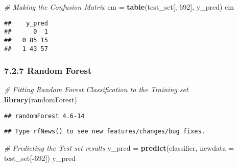 \documentclass[]{article}
\newenvironment{Shaded}{\begin{snugshade}}{\end{snugshade}}
\newcommand{\CommentTok}[1]{\textcolor[rgb]{0.56,0.35,0.01}{\textit{#1}}}
\newcommand{\DataTypeTok}[1]{\textcolor[rgb]{0.13,0.29,0.53}{#1}}
\newcommand{\DecValTok}[1]{\textcolor[rgb]{0.00,0.00,0.81}{#1}}
\newcommand{\KeywordTok}[1]{\textcolor[rgb]{0.13,0.29,0.53}{\textbf{#1}}}
\newcommand{\NormalTok}[1]{#1}
\newcommand{\OperatorTok}[1]{\textcolor[rgb]{0.81,0.36,0.00}{\textbf{#1}}}
\newcommand{\StringTok}[1]{\textcolor[rgb]{0.31,0.60,0.02}{#1}}
\begin{document}
\begin{Shaded}
\begin{Highlighting}[]
\CommentTok{# Making the Confusion Matrix}
\NormalTok{cm =}\StringTok{ }\KeywordTok{table}\NormalTok{(test_set[, }\DecValTok{692}\NormalTok{], y_pred)}
\NormalTok{cm}
\end{Highlighting}
\end{Shaded}

\begin{verbatim}
##    y_pred
##      0  1
##   0 85 15
##   1 43 57
\end{verbatim}

\hypertarget{random-forest}{%
\subsubsection{7.2.7 Random Forest}\label{random-forest}}

\begin{Shaded}
\begin{Highlighting}[]
\CommentTok{# Fitting Random Forest Classification to the Training set}
\KeywordTok{library}\NormalTok{(randomForest)}
\end{Highlighting}
\end{Shaded}

\begin{verbatim}
## randomForest 4.6-14
\end{verbatim}

\begin{verbatim}
## Type rfNews() to see new features/changes/bug fixes.
\end{verbatim}

\begin{Shaded}
\end{Shaded}

\begin{Shaded}
\begin{Highlighting}[]
\CommentTok{# Predicting the Test set results}
\NormalTok{y_pred =}\StringTok{ }\KeywordTok{predict}\NormalTok{(classifier, }\DataTypeTok{newdata =}\NormalTok{ test_set[}\OperatorTok{-}\DecValTok{692}\NormalTok{])}
\NormalTok{y_pred}
\end{Highlighting}
\end{Shaded}
\end{document}
